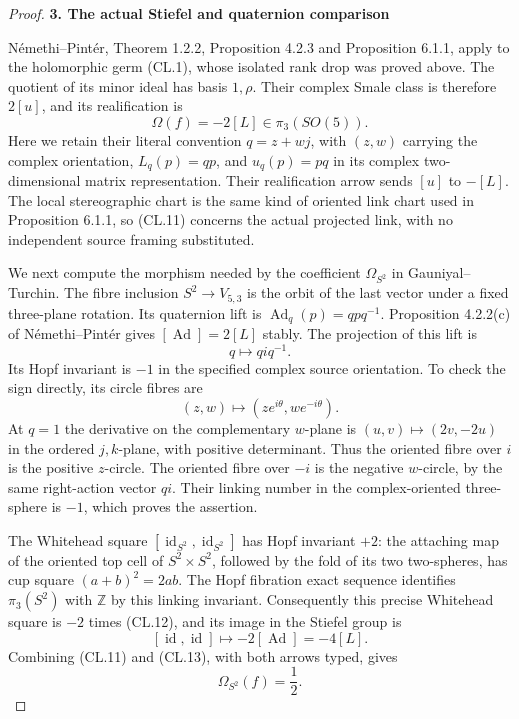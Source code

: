 \begin{proof}
\par

\medskip\noindent\textbf{3. The actual Stiefel and quaternion comparison}

\par\nobreak

Némethi--Pintér, Theorem 1.2.2, Proposition 4.2.3 and Proposition 6.1.1,
apply to the holomorphic germ (CL.1), whose isolated rank drop was proved
above. The quotient of its minor ideal has basis \(1,\rho\). Their
complex Smale class is therefore \(2[u]\), and its realification is
\[
                  \Omega(f)=-2[L]\in\pi_3(SO(5)).                \tag{CL.11}
\]
Here we retain their literal convention
\(q=z+w j\), with \((z,w)\) carrying the complex orientation,
\(L_q(p)=qp\), and \(u_q(p)=pq\) in its complex two-dimensional
matrix representation. Their realification arrow sends \([u]\) to
\(-[L]\). The local stereographic chart is the same kind of
oriented link chart used in Proposition 6.1.1, so (CL.11) concerns the
actual projected link, with no independent source framing substituted.

We next compute the morphism needed by the coefficient
\(\Omega_{S^2}\) in Gauniyal--Turchin. The fibre inclusion
\(S^2\to V_{5,3}\) is the orbit of the last vector under a fixed
three-plane rotation. Its quaternion lift is
\(\operatorname{Ad}_q(p)=qpq^{-1}\). Proposition 4.2.2(c) of
Némethi--Pintér gives \([\operatorname{Ad}]=2[L]\) stably.
The projection of this lift is
\[
                            q\longmapsto qi q^{-1}.              \tag{CL.12}
\]
Its Hopf invariant is \(-1\) in the specified complex source
orientation. To check the sign directly, its circle fibres are
\[
          (z,w)\longmapsto(ze^{i\theta},we^{-i\theta}).
\]
At \(q=1\) the derivative on the complementary \(w\)-plane is
\((u,v)\mapsto(2v,-2u)\) in the ordered \(j,k\)-plane, with
positive determinant. Thus the oriented fibre over \(i\) is the
positive \(z\)-circle. The oriented fibre over \(-i\) is the
negative \(w\)-circle, by the same right-action vector \(qi\).
Their linking number in the complex-oriented three-sphere is \(-1\),
which proves the assertion.

The Whitehead square \([\operatorname{id}_{S^2},
\operatorname{id}_{S^2}]\) has Hopf invariant \(+2\): the attaching
map of the oriented top cell of \(S^2\times S^2\), followed by
the fold of its two two-spheres, has cup square
\((a+b)^2=2ab\). The Hopf fibration exact sequence identifies
\(\pi_3(S^2)\) with \(\mathbb Z\) by this linking invariant.
Consequently this precise Whitehead square is \(-2\) times
(CL.12), and its image in the Stiefel group is
\[
       [\operatorname{id},\operatorname{id}]
                \longmapsto-2[\operatorname{Ad}]=-4[L].         \tag{CL.13}
\]
Combining (CL.11) and (CL.13), with both arrows typed, gives
\[
                             \Omega_{S^2}(f)=\frac12.             \tag{CL.14}
\]


\end{proof}
